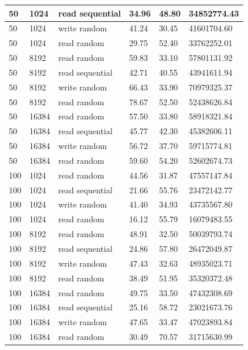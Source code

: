 \begin{tabularx}{\textwidth}{|X|X|X|X|X|X|}
    \hline
    50 & 1024 & read sequential & 34.96 & 48.80 & 34852774.43 \\
    \hline
    50 & 1024 & write random & 41.24 & 30.45 & 41601704.60 \\
    \hline
    50 & 1024 & read random & 29.75 & 52.40 & 33762252.01 \\
    \hline
    \hline
    \rowcolor{lightgray} 50 & 8192 & read random & 59.83 & 33.10 & 57801131.92 \\
    \hline
    \rowcolor{lightgray} 50 & 8192 & read sequential & 42.71 & 40.55 & 43941611.94 \\
    \hline
    \rowcolor{lightgray} 50 & 8192 & write random & 66.43 & 33.90 & 70979325.37 \\
    \hline
    \rowcolor{lightgray} 50 & 8192 & read random & 78.67 & 52.50 & 52438626.84\\
    \hline
    \hline
    50 & 16384 & read random & 57.50 & 33.80 & 58918321.84 \\
    \hline
    50 & 16384 & read sequential & 45.77 & 42.30 & 45382606.11 \\
    \hline
    50 & 16384 & write random & 56.72 & 37.70 & 59715774.81 \\
    \hline
    50 & 16384 & read random & 59.60 & 54.20 & 52602674.73 \\
    \hline
    \hline
    \rowcolor{lightgray} 100 & 1024 & read random & 44.56 & 31.87 & 47557147.84 \\
    \hline
    \rowcolor{lightgray} 100 & 1024 & read sequential & 21.66 & 55.76 & 23472142.77 \\
    \hline
    \rowcolor{lightgray} 100 & 1024 & write random & 41.40 & 34.93 & 43735567.80 \\
    \hline
    \rowcolor{lightgray} 100 & 1024 & read random & 16.12 & 55.79 & 16079483.55 \\
    \hline
    \hline
    100 & 8192 & read random & 48.91 & 32.50 & 50039793.74 \\
    \hline
    100 & 8192 & read sequential & 24.86 & 57.80 & 26472049.87 \\
    \hline
    100 & 8192 & write random & 47.43 & 32.63 & 48935023.71 \\
    \hline
    100 & 8192 & read random & 38.49 & 51.95 & 35320372.48 \\
    \hline
    \hline
    \rowcolor{lightgray} 100 & 16384 & read random & 49.75 & 33.50 & 47432308.69 \\
    \hline
    \rowcolor{lightgray} 100 & 16384 & read sequential & 25.16 & 58.72 & 23021673.76 \\
    \hline
    \rowcolor{lightgray} 100 & 16384 & write random & 47.65 & 33.47 & 47023893.84 \\
    \hline
    \rowcolor{lightgray} 100 & 16384 & read random & 30.49 & 70.57 & 31715630.99 \\
    \hline
    \hline
    \end{tabularx}

